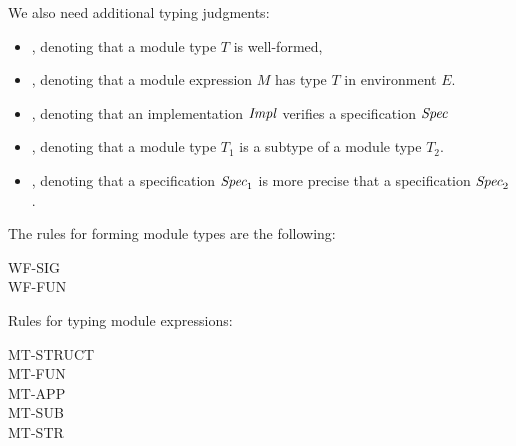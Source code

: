 We also need additional typing judgments: 
\begin{itemize}
\item {}, denoting that a module type $T$ is well-formed, 

\item {}, denoting that a module expression $M$ has type $T$ in
environment $E$.

\item {}, denoting that an implementation ${\it Impl}$
  verifies a specification $\textit{Spec}$

\item {}, denoting that a module type $T_1$ is a subtype of a
module type $T_2$.

\item {}, denoting that a specification
  $\textit{Spec}_1$ is more precise that a specification $\textit{Spec}_2$.
\end{itemize}
The rules for forming module types are the following:
\begin{description}
\item[WF-SIG]
\item[WF-FUN]
\end{description}
Rules for typing module expressions:
\begin{description}
\item[MT-STRUCT]
\item[MT-FUN]
\item[MT-APP]
\item[MT-SUB]
\item[MT-STR]
\end{description}
